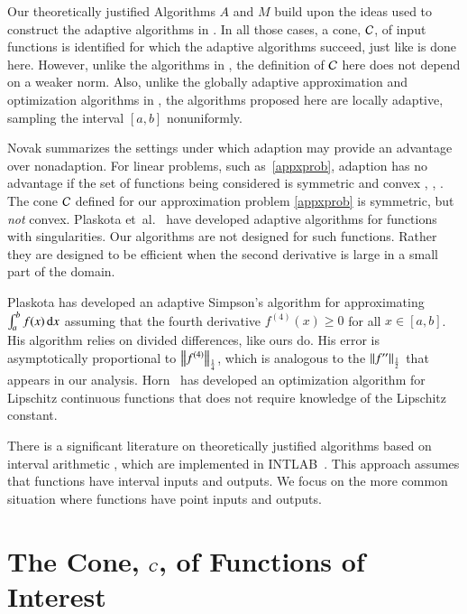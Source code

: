 \documentclass[review]{elsarticle}
\theoremstyle{definition}
\begin{document}
Our theoretically justified Algorithms $A$ and $M$ build upon the ideas used to
construct the adaptive algorithms in \cite{HicEtal14b, Din15a, HicEtal14a,
HicJim16a, Jia16a, JimHic16a,Ton14a}. In all those cases, a
cone, $\cc$, of input functions is identified for which the adaptive algorithms
succeed, just like is done here. However, unlike the algorithms in \cite{HicEtal14b, Din15a,
HicEtal14a,Ton14a}, the definition of $\cc$ here does not
depend on a weaker norm. Also, unlike
the globally adaptive approximation and optimization algorithms in
\cite{HicEtal14b,Ton14a}, the algorithms proposed here are locally adaptive,
sampling the interval $[a, b]$ nonuniformly.

Novak \cite{Nov96a} summarizes the settings under which adaption may provide an
advantage over nonadaption. For linear problems, such as~\eqref{appxprob},
adaption has no advantage if the set of functions being considered is symmetric
and convex \cite[Theorem 1]{Nov96a}, \cite[Chapter 4, Theorem
5.2.1]{TraWasWoz88}, \cite{Woz88a}.
The cone $\cc$ defined for our approximation problem
\eqref{appxprob} is symmetric, but \emph{not} convex. Plaskota et~al.~\cite{PlaEtal08a}
have developed adaptive algorithms for functions with singularities. Our
algorithms are not designed for such functions. Rather they are
designed to be efficient when the second derivative is large in a small part of
the domain.

Plaskota \cite{Pla15a} has developed an adaptive Simpson's algorithm for
approximating $\int_a^b f(x) \, \dif x$ assuming that the fourth derivative $f^{(4)}(x) \ge 0$ for all
$x \in [a,b]$. His algorithm relies on divided differences, like ours do. His
error is asymptotically proportional to $\norm[\frac14]{f^{(4)}}$, which is
analogous to the $\norm[\frac12]{f''}$ that appears in our analysis.  Horn~\cite{Hor06a}
has developed an optimization algorithm for Lipschitz continuous functions that does not
require knowledge of the Lipschitz constant.

There is a significant literature on theoretically justified algorithms based on
interval arithmetic \cite{MoKeCl09, Rum10a}, which are implemented in
INTLAB~\cite{Rum99a}. This approach assumes that functions have interval inputs
and outputs. We focus on the more common situation where functions have point
inputs and outputs.

\section{The Cone, $\cc$, of Functions of Interest} \label{sec:cone}
\end{document}

